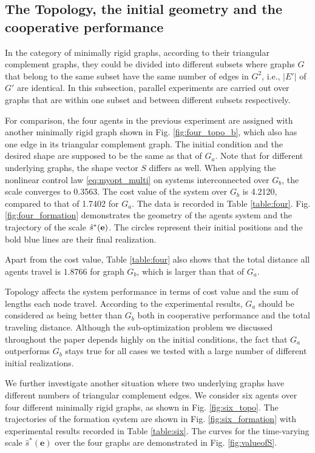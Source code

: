 \documentclass[times]{rncauth}
\newcommand{\be}{\ensuremath \mathbf{e}}
\begin{document}
\subsection{The Topology, the initial geometry and the cooperative performance}
In the category of minimally rigid graphs, according to their
triangular complement graphs, they could be divided into different
subsets where graphs $G$ that belong to the same subset have the
same number of edges in $G^2$, i.e., $|E'|$ of $G'$ are identical.
In this subsection, parallel experiments are carried out over graphs
that are within one subset and between different subsets
respectively.

For comparison, the four agents in the previous experiment are
assigned with another minimally rigid graph shown in Fig.
\ref{fig:four_topo_b}, which also has one edge in its triangular
complement graph. The initial condition and the desired shape are
supposed to be the same as that of $G_a$. Note that for different
underlying graphs, the shape vector $S$ differs as well. When
applying the nonlinear control law \eqref{eq:myopt_multi} on systems
interconnected over $G_b$, the scale converges to 0.3563. The cost
value of the system over $G_b$ is 4.2120, compared to that of 1.7402
for $G_a$. The data is recorded in Table \ref{table:four}. Fig.
\ref{fig:four_formation} demonstrates the geometry of the agents
system and the trajectory of the scale $\hat{s}^*(\be)$. The circles
represent their initial positions
 and the bold blue lines are their final realization.

Apart from the cost value, Table \ref{table:four} also shows that
the total distance all agents travel is $1.8766$ for graph $G_b$,
which is larger than that of $G_a$.

Topology affects the system performance in terms of cost value and
the sum of lengths each node travel. According to the experimental
results, $G_a$ should be considered as being better than $G_b$ both
in cooperative performance and the total traveling distance.
Although the sub-optimization problem we discussed throughout the
paper depends highly on the initial conditions, the fact that $G_a$
outperforms $G_b$ stays true for all cases we tested with a large
number of different initial realizations.

We further investigate another situation where  two underlying
graphs have different numbers of triangular complement edges. We
consider six agents over four different minimally rigid graphs, as
shown in Fig. \ref{fig:six_topo}.  The trajectories of the formation
system are shown in Fig. \ref{fig:six_formation} with experimental
results recorded in Table \ref{table:six}. The curves for the
time-varying scale $\hat{s}^*(\mathbf{e})$ over the four graphs are
demonstrated in Fig. \ref{fig:valueofS}.
\end{document}
